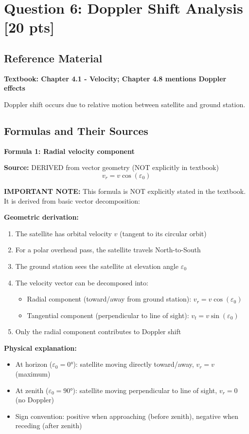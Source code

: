 \documentclass[11pt,letterpaper]{article}
\begin{document}
\section{Question 6: Doppler Shift Analysis [20 pts]}

\subsection{Reference Material}
\textbf{Textbook: Chapter 4.1 - Velocity; Chapter 4.8 mentions Doppler effects}

Doppler shift occurs due to relative motion between satellite and ground station.

\subsection{Formulas and Their Sources}

\textbf{Formula 1: Radial velocity component}

\textbf{Source:} DERIVED from vector geometry (NOT explicitly in textbook)
\begin{equation}
v_r = v \cos(\varepsilon_0)
\end{equation}

\textbf{IMPORTANT NOTE:} This formula is NOT explicitly stated in the textbook. It is derived from basic vector decomposition:

\textbf{Geometric derivation:}
\begin{enumerate}
    \item The satellite has orbital velocity $v$ (tangent to its circular orbit)
    \item For a polar overhead pass, the satellite travels North-to-South
    \item The ground station sees the satellite at elevation angle $\varepsilon_0$
    \item The velocity vector can be decomposed into:
    \begin{itemize}
        \item Radial component (toward/away from ground station): $v_r = v \cos(\varepsilon_0)$
        \item Tangential component (perpendicular to line of sight): $v_t = v \sin(\varepsilon_0)$
    \end{itemize}
    \item Only the radial component contributes to Doppler shift
\end{enumerate}

\textbf{Physical explanation:}
\begin{itemize}
    \item At horizon ($\varepsilon_0 = 0°$): satellite moving directly toward/away, $v_r = v$ (maximum)
    \item At zenith ($\varepsilon_0 = 90°$): satellite moving perpendicular to line of sight, $v_r = 0$ (no Doppler)
    \item Sign convention: positive when approaching (before zenith), negative when receding (after zenith)
\end{itemize}
\end{document}
